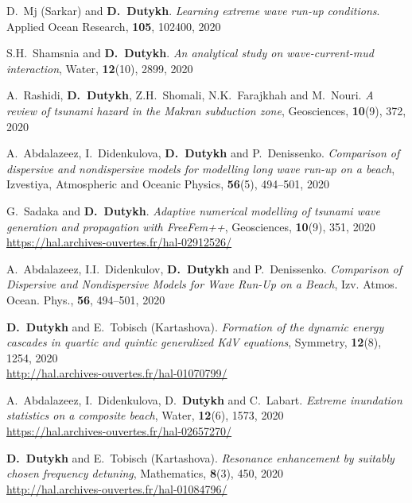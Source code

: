 \documentclass[final, a4paper, oneside, 12pt]{article}
\numberwithin{equation}{section}
\begin{document}
\begin{etaremune}
  \item D.~Mj (Sarkar) and \textbf{D.~Dutykh}. \textit{Learning extreme wave run-up conditions}. Applied Ocean Research, \textbf{105}, 102400, 2020 %
  
  \item S.H.~Shamsnia and \textbf{D.~Dutykh}. \textit{An analytical study on wave-current-mud interaction}, Water, \textbf{12}(10), 2899, 2020 %
  
  \item A.~Rashidi, \textbf{D.~Dutykh}, Z.H.~Shomali, N.K.~Farajkhah and M.~Nouri. \textit{A review of tsunami hazard in the Makran subduction zone}, Geosciences, \textbf{10}(9), 372, 2020 %
  
  \item A.~Abdalazeez, I.~Didenkulova, \textbf{D.~Dutykh} and P.~Denissenko. \textit{Comparison of dispersive and nondispersive models for modelling long wave run-up on a beach}, Izvestiya, Atmospheric and Oceanic Physics, \textbf{56}(5), 494--501, 2020 %
  
  \item G.~Sadaka and \textbf{D.~Dutykh}. \textit{Adaptive numerical modelling of tsunami wave generation and propagation with FreeFem++}, Geosciences, \textbf{10}(9), 351, 2020 \\ %
  \url{https://hal.archives-ouvertes.fr/hal-02912526/}
  
  \item A.~Abdalazeez, I.I.~Didenkulov, \textbf{D.~Dutykh} and P.~Denissenko. \textit{Comparison of Dispersive and Nondispersive Models for Wave Run-Up on a Beach}, Izv. Atmos. Ocean. Phys., \textbf{56}, 494--501, 2020 %
  
  \item \textbf{D.~Dutykh} and E.~Tobisch (Kartashova). \textit{Formation of the dynamic energy cascades in quartic and quintic generalized KdV equations}, Symmetry, \textbf{12}(8), 1254, 2020 \\ %
  \url{http://hal.archives-ouvertes.fr/hal-01070799/}
  
  \item A.~Abdalazeez, I.~Didenkulova, D.~\textbf{Dutykh} and C.~Labart. \textit{Extreme inundation statistics on a composite beach}, Water, \textbf{12}(6), 1573, 2020 \\ %
  \url{https://hal.archives-ouvertes.fr/hal-02657270/}
  
  \item \textbf{D.~Dutykh} and E.~Tobisch (Kartashova). \textit{Resonance enhancement by suitably chosen frequency detuning}, Mathematics, \textbf{8}(3), 450, 2020 \\ %
  \url{http://hal.archives-ouvertes.fr/hal-01084796/}
  

\end{etaremune}
\end{document}

